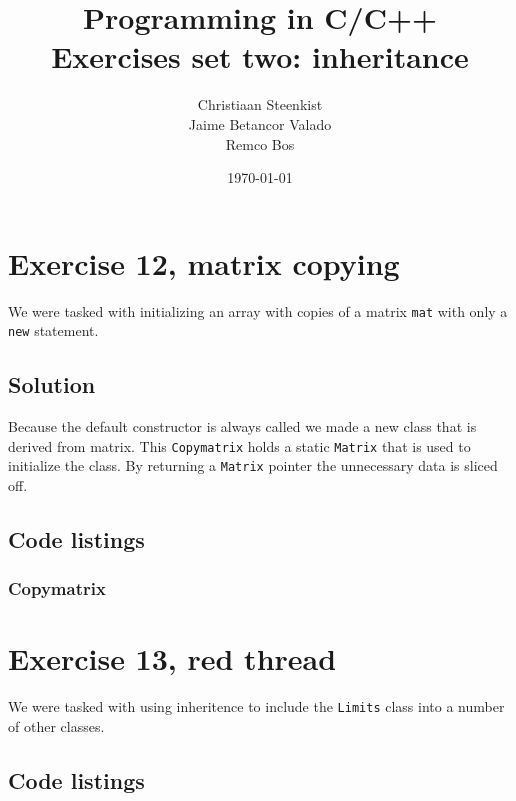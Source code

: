 \documentclass[11pt]{article}
\begin{document}
\title{Programming in C/C++ \\
       Exercises set two: inheritance
}
\date{\today}
\author{Christiaan Steenkist \\
Jaime Betancor Valado \\
Remco Bos \\
}

\maketitle

\section*{Exercise 12, matrix copying}
We were tasked with initializing an array with copies of a matrix \texttt{mat} with only a \texttt{new} statement.

\subsection*{Solution}
Because the default constructor is always called we made a new class that is derived from matrix.
This \texttt{Copymatrix} holds a static \texttt{Matrix} that is used to initialize the class.
By returning a \texttt{Matrix} pointer the unnecessary data is sliced off.

\subsection*{Code listings}





\subsubsection*{Copymatrix}




\section*{Exercise 13, red thread}
We were tasked with using inheritence to include the \texttt{Limits} class into a number of other classes.

\subsection*{Code listings}




\end{document}
